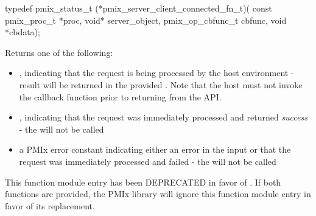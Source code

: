 \format

\cspecificstart
\begin{codepar}
typedef pmix_status_t (*pmix_server_client_connected_fn_t)(
                             const pmix_proc_t *proc,
                             void* server_object,
                             pmix_op_cbfunc_t cbfunc,
                             void *cbdata);
\end{codepar}
\cspecificend

\begin{arglist}
\end{arglist}

Returns one of the following:

\begin{itemize}
    \item {}, indicating that the request is being processed by the host environment - result will be returned in the provided . Note that the host must not invoke the callback function prior to returning from the \ac{API}.
    \item {}, indicating that the request was immediately processed and returned \textit{success} - the  will not be called
    \item a PMIx error constant indicating either an error in the input or that the request was immediately processed and failed - the  will not be called
\end{itemize}

\descr

This function module entry has been DEPRECATED in favor of . If both functions are provided, the \ac{PMIx} library will ignore this function module entry in favor of its replacement.

\subsection{}

\summary

